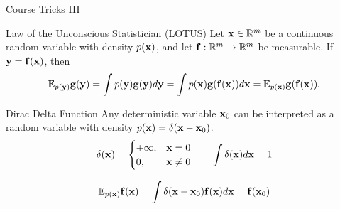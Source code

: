 \documentclass{beamer}
\renewcommand{\eqpause}{}
\renewcommand{\nextonslide}[1]{#1}
\begin{document}
\begin{frame}{Course Tricks III}
	\begin{block}{Law of the Unconscious Statistician (LOTUS)}
		Let $\mathbf{x} \in \mathbb{R}^m$ be a continuous random variable with density $p(\mathbf{x})$, and let $\mathbf{f}: \mathbb{R}^m \to \mathbb{R}^m$ be measurable. If $\mathbf{y} = \mathbf{f}(\mathbf{x})$, then
		$$
			\bbE_{p(\by)} \bg(\by) = \int p(\by) \bg(\by) d\by \nextonslide{= \int p(\bx) \bg(\bff(\bx)) d\bx = \bbE_{p(\bx)} \bg(\bff(\bx))}.
		$$
		\vspace{-0.4cm}
	\end{block}
    \eqpause
	\begin{block}{Dirac Delta Function}
		Any deterministic variable $\mathbf{x}_0$ can be interpreted as a random variable with density $p(\mathbf{x}) = \delta(\mathbf{x} - \mathbf{x}_0)$. 
		\vspace{-0.3cm}
		$$
			\delta(\mathbf{x}) = 
			\begin{cases}
				+\infty, & \mathbf{x} = 0 \\
				0, & \mathbf{x} \neq 0
			\end{cases} \qquad 
			\int \delta(\mathbf{x}) d\mathbf{x} = 1
		$$
        \eqpause
		$$
			\mathbb{E}_{p(\mathbf{x})}\mathbf{f}(\mathbf{x}) = \int \delta (\mathbf{x} - \mathbf{x}_0) \mathbf{f}(\mathbf{x}) d\mathbf{x} = \mathbf{f}(\mathbf{x}_0)
		$$
	\end{block}
\end{frame}
\end{document}
